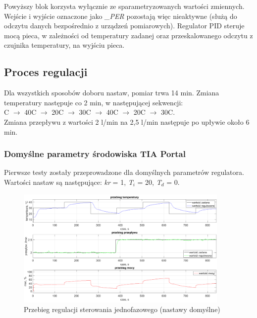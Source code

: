 \documentclass[a4paper,twoside,12pt]{book}
\begin{document}
\noindent Powyższy blok korzysta wyłącznie ze sparametryzowanych wartości zmiennych. Wejście i wyjście oznaczone jako \textit{\_PER} pozostają więc nieaktywne (służą do odczytu danych bezpośrednio z urządzeń pomiarowych). Regulator PID steruje mocą pieca, w zależności od temperatury zadanej oraz przeskalowanego odczytu z czujnika temperatury, na wyjściu pieca.

\subsection{Proces regulacji}
Dla wszystkich sposobów doboru nastaw, pomiar trwa 14 min. Zmiana temperatury następuje co 2 min, w następującej sekwencji:\\
\textdegree{}C $\rightarrow$ 40\textdegree{}C $\rightarrow$ 20\textdegree{}C $\rightarrow$ 30\textdegree{}C $\rightarrow$ 40\textdegree{}C $\rightarrow$ 20\textdegree{}C $\rightarrow$ 30\textdegree{}C.\\
\noindent Zmiana przepływu z wartości 2 l/min na 2,5 l/min następuje po upływie około 6 min.

\subsubsection{Domyślne parametry środowiska TIA Portal}
Pierwsze testy zostały przeprowadzone dla domyślnych parametrów regulatora.\\Wartości nastaw są następujące: \textit{kr} = 1, \textit{T$_i$} = 20, \textit{T$_d$} = 0.

\newpage
\begin{figure}[h]
	\centering
	\includegraphics[width=0.92\textwidth]{./wykresy/png/regulation(default)OnePhase.png}
	\caption{Przebieg regulacji sterowania jednofazowego (nastawy domyślne)}
	\label{fig:Jednofazowe domyślne}
\end{figure}
\end{document}
